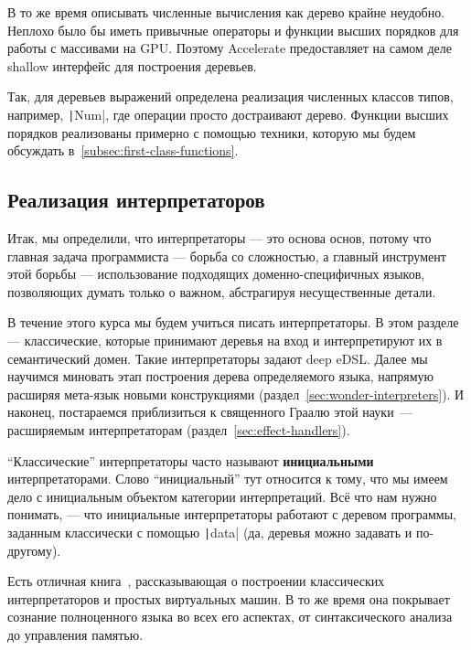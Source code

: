 \documentclass[12pt]{article}
\newcommand{\vocab}[1]{\textbf{#1}} %
\begin{document}
    В то же время описывать численные вычисления как дерево крайне неудобно.
    Неплохо было бы иметь привычные операторы и функции высших порядков для работы с массивами на GPU\@.
    Поэтому Accelerate предоставляет на самом деле shallow интерфейс для построения деревьев.

    Так, для деревьев выражений определена реализация численных классов типов, например, \texttt|Num|, где операции просто достраивают дерево.
    Функции высших порядков реализованы примерно с помощью техники, которую мы будем обсуждать в~\ref{subsec:first-class-functions}.


    \subsection{Реализация интерпретаторов}

    Итак, мы определили, что интерпретаторы --- это основа основ, потому что главная задача программиста --- борьба со сложностью, а главный инструмент этой борьбы --- использование подходящих доменно-специфичных языков, позволяющих думать только о важном, абстрагируя несущественные детали.

    В течение этого курса мы будем учиться писать интерпретаторы.
    В этом разделе --- классические, которые принимают деревья на вход и интерпретируют их в семантический домен.
    Такие интерпретаторы задают deep eDSL\@.
    Далее мы научимся миновать этап построения дерева определяемого языка, напрямую расширяя мета-язык новыми конструкциями (раздел~\ref{sec:wonder-interpreters}).
    И наконец, постараемся приблизиться к священного Граалю этой науки~--- расширяемым интерпретаторам (раздел~\ref{sec:effect-handlers}).

    ``Классические'' интерпретаторы часто называют \vocab{инициальными} интерпретаторами.
    Слово ``инициальный'' тут относится к тому, что мы имеем дело с инициальным объектом категории интерпретаций.
    Всё что нам нужно понимать, --- что инициальные интерпретаторы работают с деревом программы, заданным классически с помощью \texttt|data| (да, деревья можно задавать и по-другому).

    Есть отличная книга~\cite{nystrom2021crafting}, рассказывающая о построении классических интерпретаторов и простых виртуальных машин.
    В то же время она покрывает сознание полноценного языка во всех его аспектах, от синтаксического анализа до управления памятью.
\end{document}

